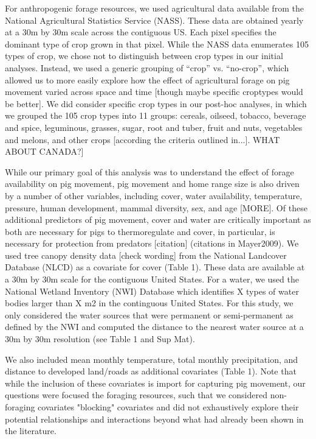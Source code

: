 \documentclass[a4paper]{article}
\begin{document}

For anthropogenic forage resources, we used agricultural data available from the National Agricultural Statistics Service (NASS). These data are obtained yearly at a 30m by 30m scale across the contiguous US. Each pixel specifies the dominant type of crop grown in that pixel.  While the NASS data enumerates 105 types of crop, we chose not to distinguish between crop types in our initial analyses. Instead, we used a generic grouping of ``crop'' vs. ``no-crop'', which allowed us to more easily explore how the effect of agricultural forage on pig movement varied across space and time [though maybe specific croptypes would be better].  We did consider specific crop types in our post-hoc analyses, in which we grouped the 105 crop types into 11 groups: cereals, oilseed, tobacco, beverage and spice, leguminous, grasses, sugar, root and tuber, fruit and nuts, vegetables and melons, and other crops [according the criteria outlined in...]. WHAT ABOUT CANADA?]

While our primary goal of this analysis was to understand the effect of forage availability on pig movement, pig movement and home range size is also driven by a number of other variables, including cover, water availability, temperature, pressure, human development, mammal diversity, sex, and age \citep{McClure2015,Garza2017,Kay2017} [MORE].  Of these additional predictors of pig movement, cover and water are critically important as both are necessary for pigs to thermoregulate \citep{Choquenot1996a} and cover, in particular, is necessary for protection from predators [citation] (citations in Mayer2009). We used tree canopy density data [check wording] from the National Landcover Database (NLCD) as a covariate for cover (Table 1). These data are available at a 30m by 30m scale for the contiguous United States. For a water, we used the National Wetland Inventory (NWI) Database which identifies X types of water bodies larger than X m2 in the continguous United States. For this study, we only considered the water sources that were permanent or semi-permanent as defined by the NWI and computed the distance to the nearest water source at a 30m by 30m resolution (see Table 1 and Sup Mat). 

We also included mean monthly temperature, total monthly precipitation, and distance to developed land/roads as additional covariates (Table 1). Note that while the inclusion of these covariates is import for capturing pig movement, our questions were focused the foraging resources, such that we considered non-foraging covariates "blocking" covariates and did not exhaustively explore their potential relationships and interactions beyond what had already been shown in the literature.  
\end{document}
